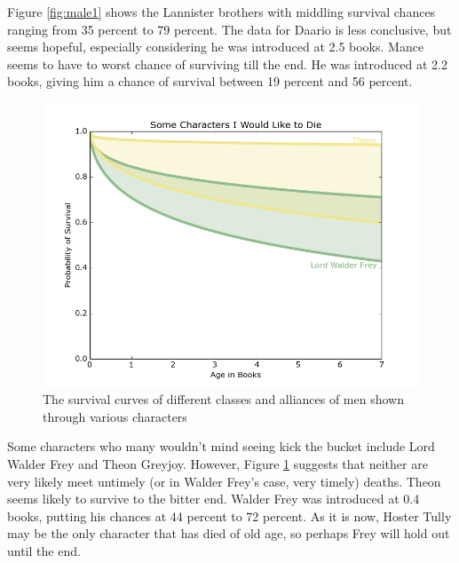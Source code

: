 \documentclass{article}
\begin{document}
Figure \ref{fig:male1} shows the Lannister brothers with middling survival chances ranging from 35 percent to 79 percent.  The data for Daario is less conclusive, but seems hopeful, especially considering he was introduced at 2.5 books. Mance seems to have to worst chance of surviving till the end.  He was introduced at 2.2 books, giving him a chance of survival between 19 percent and 56 percent.

\newpage

\begin{figure}[ht!]
\centering
\includegraphics[width=6in]{Male2.png}
\caption{The survival curves of different classes and alliances of men shown through various characters}
\label{fig:male2}
\end{figure}
Some characters who many wouldn't mind seeing kick the bucket include Lord Walder Frey and Theon Greyjoy. However, Figure \ref{fig:male2} suggests that neither are very likely meet untimely (or in Walder Frey's case, very timely) deaths.  Theon seems likely to survive to the bitter end.  Walder Frey was introduced at 0.4 books, putting his chances at 44 percent to 72 percent. As it is now, Hoster Tully may be the only character that has died of old age, so perhaps Frey will hold out until the end.
\end{document}
